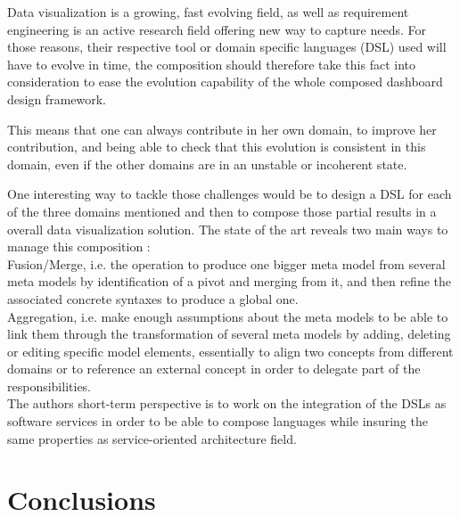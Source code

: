 \documentclass{acm_proc_article-sp}
\begin{document}
Data visualization is a growing, fast evolving field, as well as
requirement engineering is an active research field offering new way
to capture needs.  For those reasons, their respective tool or domain
specific languages (DSL) used will have to evolve in time, the composition
should therefore take this fact into consideration to ease the evolution
capability of the whole composed dashboard design framework.


This means that one can always contribute in her own domain, to improve her
contribution, and being able to check that this evolution is
consistent in this domain, even if the other domains are in an
unstable or incoherent state.

One interesting way to tackle those challenges would be to design a
DSL for each of the three domains mentioned and then to compose those
partial results in a overall data visualization solution.
The state of the art reveals two main ways to manage this composition :\\
 Fusion/Merge, i.e. the operation to produce one bigger meta
model from several meta models by identification of a pivot and
merging from it, and
then refine the associated concrete syntaxes to produce a global one. \cite{?}\\
 Aggregation, i.e. make enough assumptions about the meta models to be able to link them through the transformation of several meta models by adding, deleting or editing specific model elements, essentially to align two concepts from different domains or to reference an external concept in order to delegate part of the responsibilities. \cite{?}\\
The authors short-term perspective is to work on the integration of
the DSLs as software services in order to be able to compose languages
while insuring the same properties as service-oriented architecture
field.

\section{Conclusions}





%
\end{document}

